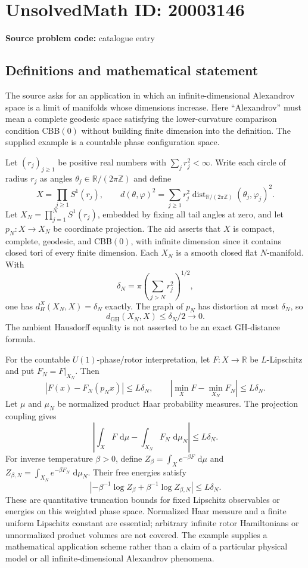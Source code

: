 \documentclass[11pt]{article}
\newcommand{\Z}{\mathbb{Z}}
\newcommand{\R}{\mathbb{R}}
\newcommand{\dd}{\,\mathrm{d}}
\begin{document}
\section*{UnsolvedMath ID: 20003146}
\textbf{Source problem code:} catalogue entry
\subsection{Definitions and mathematical statement}
The source asks for an application in which an infinite-dimensional Alexandrov space is a limit of manifolds whose dimensions increase. Here ``Alexandrov'' must mean a complete geodesic space satisfying the lower-curvature comparison condition CBB$(0)$ without building finite dimension into the definition. The supplied example is a countable phase configuration space.

Let $(r_j)_{j\geq1}$ be positive real numbers with $\sum_jr_j^2<\infty$. Write each circle of radius $r_j$ as angles $\theta_j\in\R/(2\pi\Z)$ and define
\[
X=\prod_{j\geq1}S^1(r_j),\qquad
 d(\theta,\varphi)^2=\sum_{j\geq1}r_j^2\operatorname{dist}_{\R/(2\pi\Z)}(\theta_j,\varphi_j)^2.
\]
Let $X_N=\prod_{j=1}^NS^1(r_j)$, embedded by fixing all tail angles at zero, and let $p_N:X\to X_N$ be coordinate projection. The aid asserts that $X$ is compact, complete, geodesic, and CBB$(0)$, with infinite dimension since it contains closed tori of every finite dimension. Each $X_N$ is a smooth closed flat $N$-manifold. With
\[
\delta_N=\pi\left(\sum_{j>N}r_j^2\right)^{1/2},
\]
one has $d_H^X(X_N,X)=\delta_N$ exactly. The graph of $p_N$ has distortion at most $\delta_N$, so
\[
d_{\mathrm{GH}}(X_N,X)\leq\delta_N/2\longrightarrow0.
\]
The ambient Hausdorff equality is not asserted to be an exact GH-distance formula.

For the countable $U(1)$-phase/rotor interpretation, let $F:X\to\R$ be $L$-Lipschitz and put $F_N=F|_{X_N}$. Then
\[
|F(x)-F_N(p_Nx)|\leq L\delta_N,
\qquad\left|\min_XF-\min_{X_N}F_N\right|\leq L\delta_N.
\]
Let $\mu$ and $\mu_N$ be normalized product Haar probability measures. The projection coupling gives
\[
\left|\int_XF\,\dd\mu-\int_{X_N}F_N\,\dd\mu_N\right|\leq L\delta_N.
\]
For inverse temperature $\beta>0$, define $Z_\beta=\int_Xe^{-\beta F}\,\dd\mu$ and $Z_{\beta,N}=\int_{X_N}e^{-\beta F_N}\,\dd\mu_N$. Their free energies satisfy
\[
\left|-\beta^{-1}\log Z_\beta+\beta^{-1}\log Z_{\beta,N}\right|\leq L\delta_N.
\]
These are quantitative truncation bounds for fixed Lipschitz observables or energies on this weighted phase space. Normalized Haar measure and a finite uniform Lipschitz constant are essential; arbitrary infinite rotor Hamiltonians or unnormalized product volumes are not covered. The example supplies a mathematical application scheme rather than a claim of a particular physical model or all infinite-dimensional Alexandrov phenomena.
\end{document}
